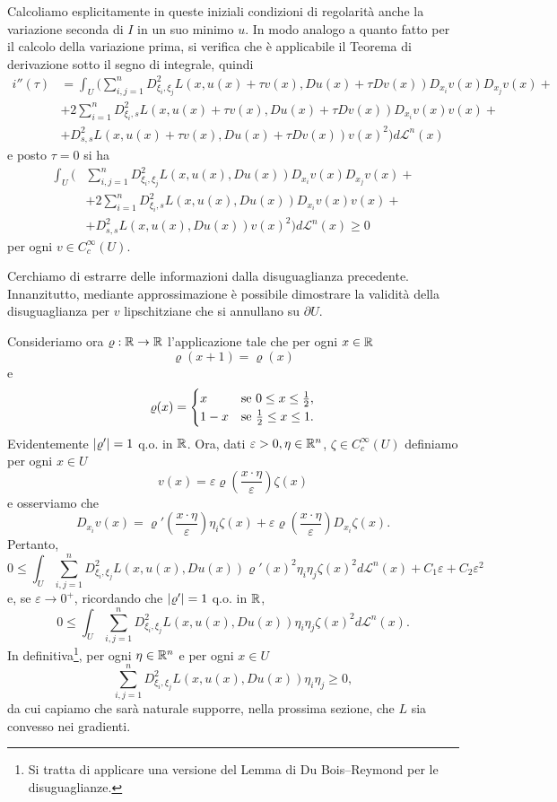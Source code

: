 Calcoliamo esplicitamente in queste iniziali condizioni di regolarità anche la variazione seconda di $I$ in un suo minimo $u$. In modo analogo a quanto fatto per il calcolo della variazione prima, si verifica che è applicabile il Teorema di derivazione sotto il segno di integrale, quindi 
\begin{align*}
	i''(\tau) &= \int_U \Biggl( \sum_{i,j=1}^nD^2_{\xi_i,\xi_j}L(x,u(x)+\tau v(x), Du(x)+\tau Dv(x)) D_{x_i}v(x)D_{x_j}v(x) +  \\
	&+  2 \sum_{i=1}^nD^2_{\xi_i,s}L(x,u(x)+\tau v(x), Du(x)+\tau Dv(x)) D_{x_i} v(x) v(x) + \\
	&+ D^2_{s,s} L(x,u(x)+\tau v(x), Du(x)+\tau Dv(x)) v(x)^2\Biggr) d\mathcal{L}^n(x)
\end{align*}
e posto $\tau = 0$ si ha
\begin{align*}
	\int_U \Biggl( &\sum_{i,j=1}^nD^2_{\xi_i,\xi_j}L(x,u(x), Du(x)) D_{x_i}v(x)D_{x_j}v(x) + \\
	&+2 \sum_{i=1}^nD^2_{\xi_i,s}L(x,u(x), Du(x)) D_{x_i} v(x) v(x) + \\
	&+ D^2_{s,s} L(x,u(x), Du(x)) v(x)^2\Biggr) d\mathcal{L}^n(x) \ge 0
\end{align*}
per ogni $v \in C^\infty_c(U)$.

Cerchiamo di estrarre delle informazioni dalla disuguaglianza precedente. Innanzitutto, mediante approssimazione è possibile dimostrare la validità della disuguaglianza per $v$ lipschitziane che si annullano su $\partial U$. 

Consideriamo ora  $\varrho : \mathbb{R} \to \mathbb{R}$ l'applicazione tale che per ogni $x \in \mathbb{R}$ 
\[ \varrho(x+1) = \varrho(x) \]
e 
\[  \varrho(x) = \begin{cases}
	x & \textup{se } 0\le x \le \frac{1}{2}, \\
	1-x & \textup{se } \frac{1}{2}\le x \le 1. \\
\end{cases} \]
Evidentemente $\lvert\varrho'\rvert = 1 $ q.o. in $\mathbb{R}$. Ora, dati $\varepsilon>0, \eta \in \mathbb{R}^n $, $\zeta \in C^\infty_c(U)$ definiamo per ogni $x \in U$
\[ v(x) = \varepsilon \varrho\left( \frac{x\cdot \eta}{\varepsilon}\right) \zeta(x) \]
e osserviamo che 
\[ D_{x_i} v(x) = \varrho'\left( \frac{x\cdot \eta}{\varepsilon}\right) \eta_i \zeta(x) + \varepsilon \varrho\left( \frac{x\cdot \eta}{\varepsilon}\right)  D_{x_i} \zeta(x). \]
Pertanto,
\[ 0 \le \int_U  \sum_{i,j=1}^n D^2_{\xi_i,\xi_j}L(x,u(x), Du(x)) \varrho'(x)^2\eta_i\eta_j \zeta(x)^2 d\mathcal{L}^n(x) + C_1 \varepsilon + C_2 \varepsilon^2  \]
e, se $\varepsilon \to 0^+$, ricordando che $\lvert\varrho'\rvert = 1 $ q.o. in $\mathbb{R}$,
\[ 0 \le \int_U \sum_{i,j=1}^n D^2_{\xi_i,\xi_j}L(x,u(x), Du(x))\eta_i\eta_j \zeta(x)^2 d\mathcal{L}^n(x). \]
In definitiva\footnote{Si tratta di applicare una versione del Lemma di Du Bois--Reymond per le disuguaglianze.}, per ogni $\eta \in \mathbb{R}^n$ e per ogni $x \in U$
\[ \sum_{i,j=1}^n D^2_{\xi_i,\xi_j}L(x,u(x), Du(x))\eta_i\eta_j \ge 0,\]
da cui capiamo che sarà naturale supporre, nella prossima sezione, che $L$ sia convesso nei gradienti.


